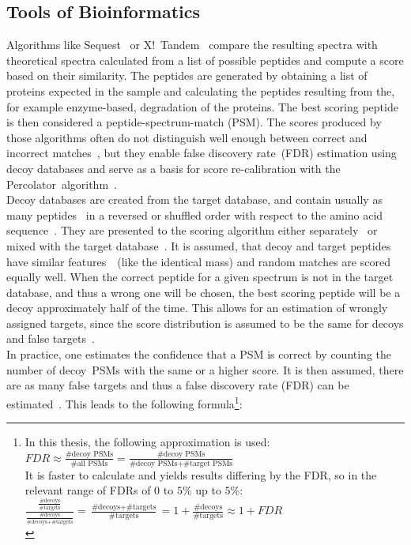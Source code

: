 	\subsection{Tools of Bioinformatics}
	\label{lab:background:bioinfo_tools}
	Algorithms like Sequest~\cite{Eng1994} or X!~Tandem~\cite{Craig2004} compare the resulting spectra with theoretical spectra calculated from a list of possible peptides and compute a score based on their similarity. The peptides are generated by obtaining a list of proteins expected in the sample and calculating the peptides resulting from the, for example enzyme-based, degradation of the proteins. The best scoring peptide is then considered a peptide-spectrum-match (PSM). The scores produced by those algorithms often do not distinguish well enough between correct and incorrect matches~\cite{Kll2007}, but they enable false discovery rate~(FDR) estimation using decoy databases and serve as a basis for score re-calibration with the Percolator~algorithm~\cite{Kll2007, Granholm2012}.\\
	Decoy databases are created from the target database, and contain usually as many peptides~\cite{Peng2003, Moore2002} in a reversed or shuffled order with respect to the amino acid sequence~\cite{Aggarwal2016}. They are presented to the scoring algorithm either separately~\cite{Granholm2012} or mixed with the target database~\cite{Peng2003}. It is assumed, that decoy and target peptides have similar features~\cite{Moore2002}~(like the identical mass) and random matches are scored equally well. When the correct peptide for a given spectrum is not in the target database, and thus a wrong one will be chosen, the best scoring peptide will be a decoy approximately half of the time. This allows for an estimation of wrongly assigned targets, since the score distribution is assumed to be the same for decoys and false targets~\cite{Aggarwal2016}.\\
	In practice, one estimates the confidence that a PSM is correct by counting the number of decoy~PSMs with the same or a higher score. It is then assumed, there are as many false targets and thus a false discovery rate (FDR) can be estimated~\cite{Granholm2012}. This leads to the following formula\footnote{In this thesis, the following approximation is used:\\
		$FDR \approx \frac{\text{\# decoy PSMs}}{\text{\# all PSMs}} = \frac{\text{\# decoy PSMs}}{\text{\# decoy PSMs} + \text{\# target PSMs}}$\\
		It is faster to calculate and yields results differing by the FDR, so in the relevant range of FDRs of $0$ to $5\%$ up to $5\%$:\\
		$\frac{\frac{\text{\# decoys}}{\text{\# targets}}}{\frac{\text{\# decoys}}{\text{\# decoys} + \text{\# targets}}} = \frac{\text{\# decoys} + \text{\# targets}}{\text{\# targets}} = 1 + \frac{\text{\# decoys}}{\text{\# targets}} \approx 1 + FDR$\\}:
